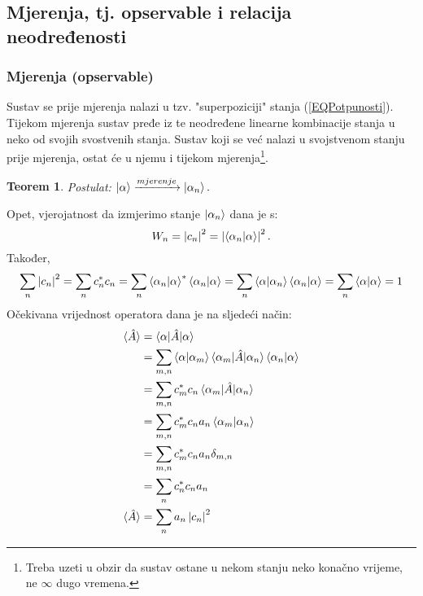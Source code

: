 \documentclass{article}
\newtheorem{theorem}{Teorem}[section]
\numberwithin{equation}{section}
\begin{document}
\subsection{Mjerenja, tj. opservable i relacija neodređenosti}
\subsubsection{Mjerenja (opservable)}
Sustav se prije mjerenja nalazi u tzv. "superpoziciji" stanja (\ref{EQPotpunosti}). Tijekom mjerenja
sustav pređe iz te neodređene linearne kombinacije stanja u neko od svojih svostvenih stanja.
Sustav koji se već nalazi u svojstvenom stanju prije mjerenja, ostat će u njemu i tijekom mjerenja\footnote{Treba uzeti u obzir da sustav ostane
u nekom stanju neko konačno vrijeme, ne $\infty$ dugo vremena.}.
\begin{theorem}
	Postulat: $\ket{\alpha} \xrightarrow{mjerenje} \ket{\alpha_n}.$
\end{theorem}
Opet, vjerojatnost da izmjerimo stanje $\ket{\alpha_n}$ dana je s: 
\begin{equation}
	W_n = \left|c_n\right|^2 = \left|\braket{\alpha_n|\alpha}\right|^2.
\end{equation}
Također,
\begin{equation}
	\sum_n \left|c_n\right|^2 = \sum_n c_n^*c_n = \sum_n \braket{\alpha_n|\alpha}^*\braket{\alpha_n|\alpha} = \sum_n \braket{\alpha|\alpha_n}\braket{\alpha_n|\alpha}
	=\sum_n \braket{\alpha|\alpha}= 1
\end{equation}
Očekivana vrijednost operatora dana je na sljedeći način:
\begin{equation}
	\begin{aligned}
		\braket{\hat{A}} &= \braket{\alpha|\hat{A}|\alpha}\\
										 &= \sum_{m,n} \braket{\alpha|\alpha_m}\braket{\alpha_m|\hat{A}|\alpha_n}\braket{\alpha_n|\alpha}\\
										 &= \sum_{m,n} c_m^*c_n \braket{\alpha_m|\hat{A}|\alpha_n}\\
										 &= \sum_{m,n} c_m^*c_n a_n \braket{\alpha_m|\alpha_n}\\
										 &= \sum_{m,n} c_m^*c_n a_n \delta_{m,n}\\
										 &= \sum_{n} c_n^*c_n a_n\\
		\braket{\hat{A}} &= \sum_n a_n \left|c_n\right|^2  
	\end{aligned}
\end{equation}
\end{document}
